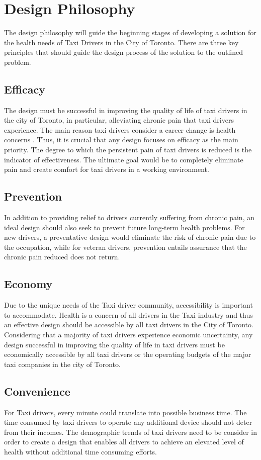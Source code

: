 \documentclass[11pt]{article}
\begin{document}
\section{Design Philosophy}
\label{sec:philo}
The design philosophy will guide the beginning stages of developing a
solution for the health needs of Taxi Drivers in the City of
Toronto. There are three key principles that should
guide the design process of the solution to the outlined problem.
 
\subsection{Efficacy}
The design must be successful in improving the quality of life of taxi 
drivers in the city of Toronto, in particular, alleviating chronic pain 
that taxi drivers experience. The main reason taxi drivers consider a 
career change is health concerns \cite{chicago}. Thus, it is crucial that 
any design focuses on efficacy as the main priority. The degree to which 
the persistent pain of taxi drivers is reduced is the indicator of 
effectiveness. The ultimate goal would be to completely eliminate pain 
and create comfort for taxi drivers in a working environment. 

\subsection{Prevention}
In addition to providing relief to drivers currently suffering from 
chronic pain, an ideal design should also seek to prevent future long-term 
health problems. For new drivers, a preventative design would eliminate
the risk of chronic pain due to the occupation, while for veteran 
drivers, prevention entails assurance that the chronic pain reduced does
not return. 
 
\subsection{Economy}
Due to the unique needs of the Taxi driver community, accessibility is 
important to accommodate. Health is a concern of all drivers in the Taxi 
industry and thus an effective design should be accessible by all taxi 
drivers in the City of Toronto. Considering that a majority of taxi 
drivers experience economic uncertainty\cite{facey2003health}, any design 
successful in improving the quality of life in taxi drivers must be
economically accessible by all taxi drivers or the operating 
budgets of the major taxi companies in the city of Toronto. 
 
\subsection{Convenience}
For Taxi drivers, every minute could translate into possible business 
time\cite{ facey2003health}. The time consumed by taxi drivers to operate 
any additional device should not deter from their incomes. The demographic 
trends of taxi drivers need to be consider in order to create a design 
that enables all drivers to achieve an elevated level of health 
without additional time consuming efforts.



\end{document}
